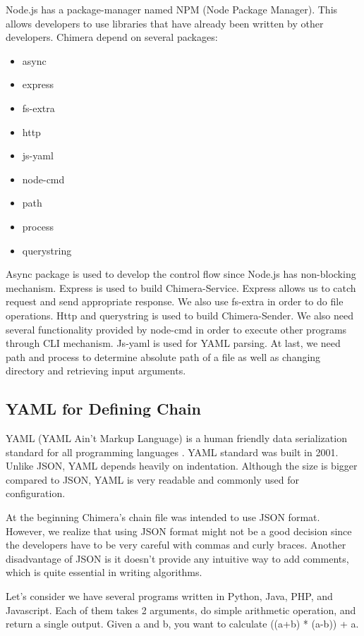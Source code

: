 \documentclass[conference]{IEEEtran}
\begin{document}
Node.js has a package-manager named NPM (Node Package Manager). This allows developers
to use libraries that have already been written by other developers. Chimera depend on 
several packages:

\begin{itemize}
    \item async
    \item express
    \item fs-extra
    \item http
    \item js-yaml
    \item node-cmd
    \item path
    \item process
    \item querystring
\end{itemize}

Async package is used to develop the control flow since Node.js has non-blocking
mechanism. Express is used to build Chimera-Service. Express allows us to catch request
and send appropriate response. We also use fs-extra in order to do file operations.
Http and querystring is used to build Chimera-Sender. We also need several functionality
provided by node-cmd in order to execute other programs through CLI mechanism.
Js-yaml is used for YAML parsing. At last, we need path and process to determine 
absolute path of a file as well as changing directory and retrieving input arguments.

\subsection{YAML for Defining Chain}

YAML (YAML Ain't Markup Language) is a human friendly data serialization standard for 
all programming languages \cite{yaml}. YAML standard was built in 2001. Unlike JSON,
YAML depends heavily on indentation. Although the size is bigger compared to JSON, YAML
is very readable and commonly used for configuration.

At the beginning Chimera's chain file was intended to use JSON format. However, we realize 
that using JSON format might not be a good decision since the developers have to be very 
careful with commas and curly braces. Another disadvantage
of JSON is it doesn't provide any intuitive way to add comments, which is quite
essential in writing algorithms.

Let's consider we have several programs written in Python, Java, PHP, and Javascript. 
Each of them takes 2 arguments, do simple arithmetic operation, and return a single output. 
Given a and b, you want to calculate ((a+b) * (a-b)) + a.
\end{document}
